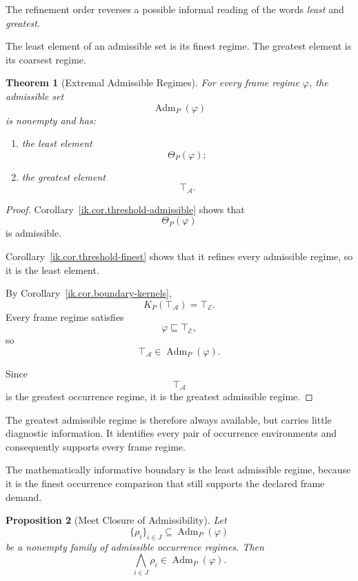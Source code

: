 \documentclass[11pt]{article}
\theoremstyle{plain}
\newtheorem{theorem}{Theorem}[section]
\newtheorem{proposition}[theorem]{Proposition}
\theoremstyle{definition}
\theoremstyle{remark}
\begin{document}
The refinement order reverses
a possible informal reading of the words
\emph{least} and \emph{greatest}.

The least element of an admissible set
is its finest regime.
The greatest element is its coarsest regime.

\begin{theorem}[Extremal Admissible Regimes]
  \label{ik.thm.extremal-admissible}
  For every frame regime \(\varphi\),
  the admissible set
  \[
    \operatorname{Adm}_P(\varphi)
  \]
  is nonempty and has:
  \begin{enumerate}[label=(\alph*)]
    \item the least element
          \[
            \Theta_P(\varphi);
          \]
    \item the greatest element
          \[
            \top_{\mathcal{A}}.
          \]
  \end{enumerate}
\end{theorem}

\begin{proof}
  Corollary~\ref{ik.cor.threshold-admissible}
  shows that
  \[
    \Theta_P(\varphi)
  \]
  is admissible.

  Corollary~\ref{ik.cor.threshold-finest}
  shows that it refines every admissible regime,
  so it is the least element.

  By Corollary~\ref{ik.cor.boundary-kernels},
  \[
    K_P(\top_{\mathcal{A}})
    =
    \top_{\mathcal{E}}.
  \]
  Every frame regime satisfies
  \[
    \varphi
    \sqsubseteq
    \top_{\mathcal{E}},
  \]
  so
  \[
    \top_{\mathcal{A}}
    \in
    \operatorname{Adm}_P(\varphi).
  \]

  Since
  \[
    \top_{\mathcal{A}}
  \]
  is the greatest occurrence regime,
  it is the greatest admissible regime.
\end{proof}

The greatest admissible regime
is therefore always available,
but carries little diagnostic information.
It identifies every pair of occurrence environments
and consequently supports every frame regime.

The mathematically informative boundary
is the least admissible regime,
because it is the finest occurrence comparison
that still supports the declared frame demand.

\begin{proposition}[Meet Closure of Admissibility]
  \label{ik.prop.admissible-meets}
  Let
  \[
    \{
    \rho_i
    \}_{i\in J}
    \subseteq
    \operatorname{Adm}_P(\varphi)
  \]
  be a nonempty family of admissible occurrence regimes.
  Then
  \[
    \bigwedge_{i\in J}
    \rho_i
    \in
    \operatorname{Adm}_P(\varphi).
  \]
\end{proposition}
\end{document}
